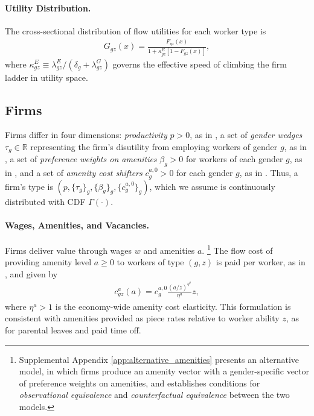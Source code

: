 \paragraph{Utility Distribution.}

The cross-sectional distribution of flow utilities for each worker type is
%
\begin{align}
    G_{gz}(x) = \frac{F_{gz}(x)}{1 + \kappa_{gz}^{E} \left[1 - F_{gz}(x)\right]},
    \label{eq:from_F_to_G}
\end{align}
%
where $\kappa_{gz}^{E} \equiv \lambda_{gz}^{E}/(\delta_{g} + \lambda_{gz}^{G})$ governs the effective speed of climbing the firm ladder in utility space.


\subsection{Firms\label{subsec:model_firms}}

Firms differ in four dimensions: \emph{productivity} $p > 0$, as in \citet{BurdettMortensen1998}, a set of \emph{gender wedges} $\tau_{g} \in \mathbb{R}$ representing the firm's disutility from employing workers of gender $g$, as in \citet{becker1971}, a set of \emph{preference weights on amenities} $\beta_{g} > 0$ for workers of each gender $g$, as in \citet{Goldin2014}, and a set of \emph{amenity cost shifters} $c_{g}^{a,0} > 0$ for each gender $g$, as in \citet{HwangMortensenReed1998}. Thus, a firm's type is $(p, \{\tau_{g}\}_{g}, \{\beta_{g}\}_{g}, \{c_{g}^{a,0}\}_{g})$, which we assume is continuously distributed with CDF $\Gamma(\cdot)$.


\paragraph{Wages, Amenities, and Vacancies.}

Firms deliver value through wages $w$ and amenities $a$.%
%
\footnote{Supplemental Appendix \ref{app:alternative_amenities} presents an alternative model, in which firms produce an amenity vector with a gender-specific vector of preference weights on amenities, and establishes conditions for \emph{observational equivalence} and \emph{counterfactual equivalence} between the two models.} %
%
The flow cost of providing amenity level $a \ge 0$ to workers of type $(g, z)$ is paid per worker, as in \cite{HwangMortensenReed1998}, and given by
%
\begin{align}
    c_{gz}^{a}(a) = c_{g}^{a,0} \frac{ (a/z)^{\eta^{a}} }{ \eta^{a} } z, \label{eq:amenity_cost_fn}
\end{align}
%
where $\eta^{a} > 1$ is the economy-wide amenity cost elasticity. This formulation is consistent with amenities provided as piece rates relative to worker ability $z$, as for parental leaves and paid time off.


